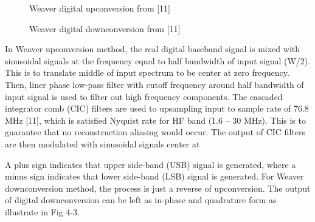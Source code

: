 \documentclass[conference]{IEEEtran}
\begin{document}
\begin{figure}[h!]
	\centering
	\caption{Weaver digital upconversion from [11]}
\end{figure}

\begin{figure}[h!]
	\centering
	\caption{Weaver digital downconversion from [11]}
\end{figure}

In Weaver upconversion method, the real digital baseband signal is mixed with sinusoidal signals at the frequency equal to half bandwidth of input signal (W/2). This is to translate middle of input spectrum to be center at zero frequency. Then, liner phase low-pass filter with cutoff frequency around half bandwidth of input signal is used to filter out high frequency components. The cascaded integrator comb (CIC) filters are used to upsampling input to sample rate of 76.8 MHz [11], which is satisfied Nyquist rate for HF band (1.6 – 30 MHz). This is to guarantee that no reconstruction aliasing would occur. The output of CIC filters are then modulated with sinusoidal signals center at
\begin{figure}[h!]
	\centering
\end{figure}
A plus sign indicates that upper side-band (USB) signal is generated, where a minus sign indicates that lower side-band (LSB) signal is generated. For Weaver downconversion method, the process is just a reverse of upconversion. The output of digital downconversion can be left as in-phase and quadrature form as illustrate in Fig 4-3. 
\end{document}
